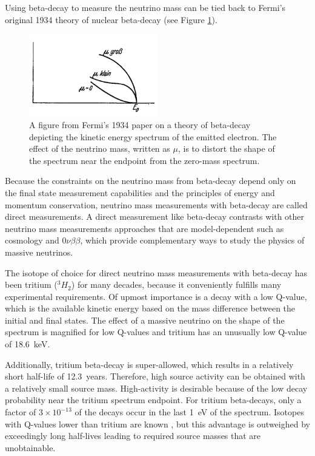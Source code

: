 Using beta-decay to measure the neutrino mass can be tied back to Fermi's original 1934 theory of nuclear beta-decay \cite{fermi_beta_decay} (see Figure \ref{fig:chap2-fermi-original-b-spectrum}).
\begin{figure}[htbp]
    \centering
    \includegraphics[width=0.5\textwidth]{figs/Chapter-2/Fermi.png}
    \caption{A figure from Fermi's 1934 paper on a theory of beta-decay depicting the kinetic energy spectrum of the emitted electron. The effect of the neutrino mass, written as $\mu$, is to distort the shape of the spectrum near the endpoint from the zero-mass spectrum.}
    \label{fig:chap2-fermi-original-b-spectrum}
\end{figure}
Because the constraints on the neutrino mass from beta-decay depend only on the final state measurement capabilities and the principles of energy and momentum conservation, neutrino mass measurements with beta-decay are called direct measurements. A direct measurement like beta-decay contrasts with other neutrino mass measurements approaches that are model-dependent such as cosmology and $0\nu\beta\beta$, which provide complementary ways to study the physics of massive neutrinos.

The isotope of choice for direct neutrino mass measurements with beta-decay has been tritium ($^3H_2$) for many decades, because it conveniently fulfills many experimental requirements. Of upmost importance is a decay with a low Q-value, which is the available kinetic energy based on the mass difference between the initial and final states. The effect of a massive neutrino on the shape of the spectrum is magnified for low Q-values and tritium has an unusually low Q-value of 18.6~keV.

Additionally, tritium beta-decay is super-allowed, which results in a relatively short half-life of 12.3~years. Therefore, high source activity can be obtained with a relatively small source mass. High-activity is desirable because of the low decay probability near the tritium spectrum endpoint. For tritium beta-decays, only a factor of $3\times10^{-13}$ of the decays occur in the last 1~eV of the spectrum. Isotopes with Q-values lower than tritium are known \cite{FORMAGGIO20211}, but this advantage is outweighed by exceedingly long half-lives leading to required source masses that are unobtainable.

